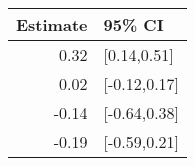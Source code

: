 \begin{tabular}{rl}
  \hline
Estimate & 95\% CI \\ 
  \hline
0.32 & [0.14,0.51] \\ 
  0.02 & [-0.12,0.17] \\ 
  -0.14 & [-0.64,0.38] \\ 
  -0.19 & [-0.59,0.21] \\ 
   \hline
\end{tabular}

